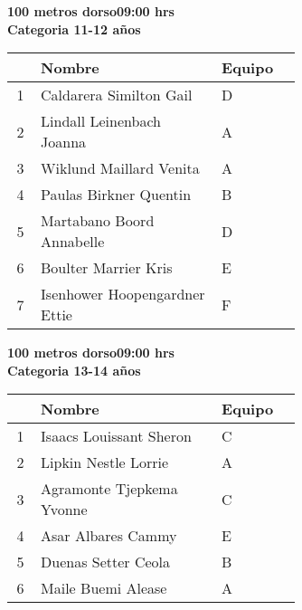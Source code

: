\begin{minipage}{0.95\linewidth}\vspace{0.5cm} 
\begin{flushleft}
\textbf{
\hspace{-0.15cm}100 metros dorso\hspace{1.5cm}09:00 hrs \\Categoria 11-12 años}\vspace{-0.2cm} 
\end{flushleft}
\begin{tabular}{cp{0.63\linewidth}l}
\hline
& \textbf{Nombre} & \textbf{Equipo} \\ \hline
1 & Caldarera Similton Gail & D \\ 
2 & Lindall Leinenbach Joanna & A \\ 
3 & Wiklund Maillard Venita & A \\ 
4 & Paulas Birkner Quentin & B \\ 
5 & Martabano Boord Annabelle & D \\ 
6 & Boulter Marrier Kris & E \\ 
7 & Isenhower Hoopengardner Ettie & F \\ 
\end{tabular}
\end{minipage}
\begin{minipage}{0.95\linewidth}\vspace{0.5cm} 
\begin{flushleft}
\textbf{
\hspace{-0.15cm}100 metros dorso\hspace{1.5cm}09:00 hrs \\Categoria 13-14 años}\vspace{-0.2cm} 
\end{flushleft}
\begin{tabular}{cp{0.63\linewidth}l}
\hline
& \textbf{Nombre} & \textbf{Equipo} \\ \hline
1 & Isaacs Louissant Sheron & C \\ 
2 & Lipkin Nestle Lorrie & A \\ 
3 & Agramonte Tjepkema Yvonne & C \\ 
4 & Asar Albares Cammy & E \\ 
5 & Duenas Setter Ceola & B \\ 
6 & Maile Buemi Alease & A \\ 
\end{tabular}
\end{minipage}
